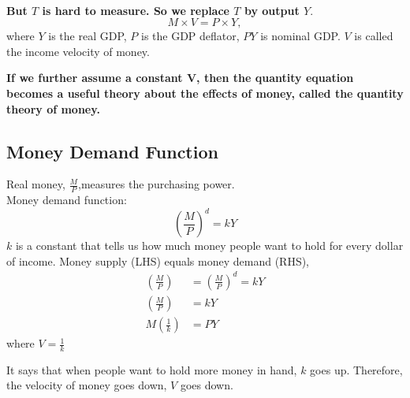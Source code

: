 \documentclass[12pt]{article}
\begin{document}
\noindent{}\\


{\textbf {But $ T $ is hard to measure. So we replace $ T $ by output $ Y $}}.
\begin{equation*}
M  \times V = P  \times Y,
\end{equation*}
where $ Y $ is the real GDP, $ P $ is the GDP deflator, $ PY $ is nominal GDP.
$ V $ is called the income velocity of money.


{\textbf {If we further assume a constant V, then the quantity equation becomes
a useful theory about the effects of money, called the quantity theory of money.}}


\subsection{Money Demand Function}
Real money, $ \frac{M}{P} $,measures the purchasing power.\\
Money demand function:
\begin{equation*}
\left( \frac{M}{P} \right) ^{d}	 = kY
\end{equation*}
$ k $ is a constant that tells us how much money people want to hold for every dollar
of income.
Money supply (LHS) equals money demand (RHS),
\begin{align*}
		\left( \frac{M}{P} \right)  &= \left( \frac{M}{P} \right) ^{d} = kY\\
\left( \frac{M}{P} \right) &= kY\\
M \left( \frac{1}{k} \right)  &= PY
\end{align*}
where $ V = \frac{1}{k} $

It says that when people want to hold more money in hand, $ k $ goes up. Therefore,
the velocity of money goes down, $ V $ goes down. 
\end{document}
